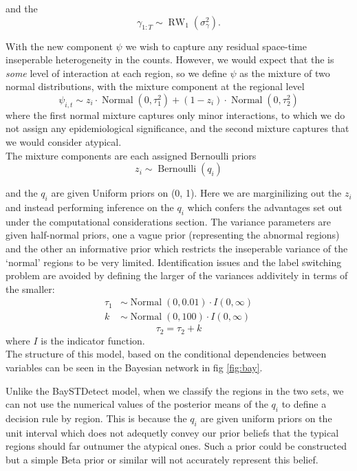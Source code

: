 \documentclass[11pt]{report}
\begin{document}
and the 
\begin{equation*}
\gamma_{1:T} \sim \operatorname{RW}_1(\sigma_\gamma^2).
\end{equation*}

With the new component $\psi$ we wish to capture any residual space-time inseperable heterogeneity in the counts. However, we would expect that the is \emph{some} level of interaction at each region, so we define $\psi$ as the mixture of two normal distributions, with the mixture component at the regional level
\begin{equation}
\psi_{i,t} \sim z_i \cdot \operatorname{Normal}(0, \tau_1^2) + (1 - z_i) \cdot \operatorname{Normal}(0, \tau_2^2)
\end{equation} 
where the first normal mixture captures only minor interactions, to which we do not assign any epidemiological significance, and the second mixture captures that we would consider atypical. \\

The mixture components are each assigned Bernoulli priors 
\begin{equation}
  z_i \sim \operatorname{Bernoulli}(q_i)
\end{equation}

and the $q_i$ are given Uniform priors on (0, 1). Here we are marginilizing out the $z_i$ and instead performing inference on the $q_i$ which confers the advantages set out under the computational considerations section. The variance parameters are given half-normal priors, one a vague prior (representing the abnormal regions) and the other an informative prior which restricts the inseperable variance of the `normal' regions to be very limited. Identification issues and the label switching problem are avoided by defining the larger of the variances addivitely in terms of the smaller:
\begin{align}
  \tau_1 &\sim \operatorname{Normal}(0, 0.01) \cdot I(0, \infty) \\
  k &\sim \operatorname{Normal}(0, 100) \cdot I(0, \infty)
\end{align}
\begin{equation}
 \tau_2 = \tau_2 + k
\end{equation}
where $I$ is the indicator function. \\

The structure of this model, based on the conditional dependencies between variables can be seen in the Bayesian network in fig \ref{fig:bay}. 

Unlike the BaySTDetect model, when we classify the regions in the two sets, we can not use the numerical values of the posterior means of the $q_i$ to define a decision rule by region. This is because the $q_i$ are given uniform priors on the unit interval which does not adequetly convey our prior beliefs that the typical regions should far outnumer the atypical ones. Such a prior could be constructed but a simple Beta prior or similar will not accurately represent this belief. \\
\end{document}
